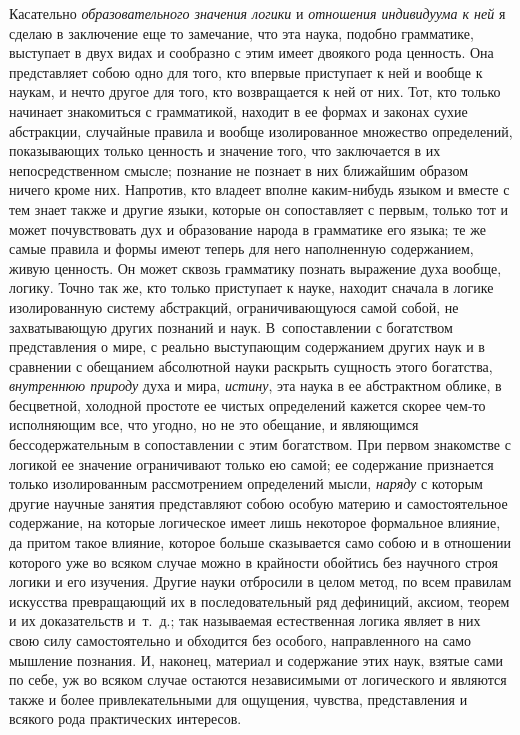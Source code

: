 Касательно {\em образовательного значения логики} и
{\em отношения индивидуума к ней} я сделаю в заключение
еще то замечание, что эта наука, подобно грамматике, выступает в двух видах
и сообразно с этим имеет двоякого рода ценность. Она представляет собою
одно для того, кто впервые приступает к ней и вообще к наукам, и нечто
другое для того, кто возвращается к ней от них. Тот, кто только начинает
знакомиться с грамматикой, находит в ее формах и законах сухие абстракции,
случайные правила и вообще изолированное множество определений,
показывающих только ценность и значение того, что заключается в их
непосредственном смысле; познание не познает в них ближайшим образом ничего
кроме них. Напротив, кто владеет вполне каким-нибудь языком и вместе с тем
знает также и другие языки, которые он сопоставляет с первым, только тот и
может почувствовать дух и образование народа в грамматике его языка; те же
самые правила и формы имеют теперь для него наполненную содержанием, живую
ценность. Он может сквозь грамматику познать выражение духа вообще, логику.
Точно так же, кто только приступает к науке, находит сначала в логике
изолированную систему абстракций, ограничивающуюся самой собой, не
захватывающую других познаний и наук. В~сопоставлении с богатством
представления о мире, с реально выступающим содержанием других наук и в
сравнении с обещанием абсолютной науки раскрыть сущность этого богатства,
{\em внутреннюю природу} духа и мира,
{\em истину}, эта наука в ее абстрактном облике, в
бесцветной, холодной простоте ее чистых определений кажется скорее чем-то
исполняющим все, что угодно, но не это обещание, и являющимся
бессодержательным в сопоставлении с этим богатством. При первом знакомстве
с логикой ее значение ограничивают только ею самой; ее содержание
признается только изолированным рассмотрением определений мысли,
{\em наряду} с которым другие научные занятия
представляют собою особую материю и самостоятельное содержание, на которые
логическое имеет лишь некоторое формальное влияние, да притом такое
влияние, которое больше сказывается само собою и в отношении которого уже
во всяком случае можно в крайности обойтись без научного строя логики и его
изучения. Другие науки отбросили в целом метод, по всем правилам искусства
превращающий их в последовательный ряд дефиниций, аксиом, теорем и их
доказательств и~т.~д.; так называемая естественная логика являет в них свою
силу самостоятельно и обходится без особого, направленного на само мышление
познания. И, наконец, материал и содержание этих наук, взятые сами по себе,
уж во всяком случае остаются независимыми от логического и являются также и
более привлекательными для ощущения, чувства, представления и всякого рода
практических интересов.

